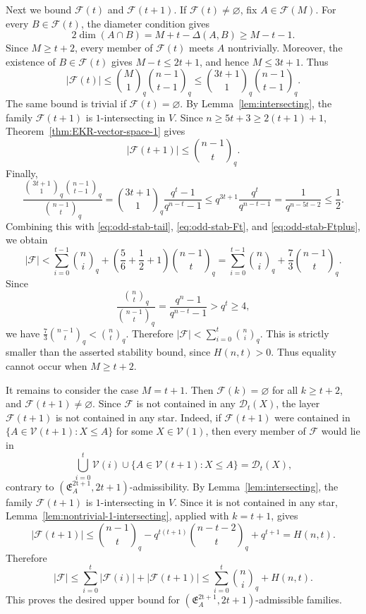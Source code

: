 \documentclass[11pt]{article}
\theoremstyle{definition}
\newcommand{\qbinom}[2]{\genfrac{(}{)}{0pt}{}{#1}{#2}_q}
\begin{document}
 
Next we bound $\mathcal F(t)$ and $\mathcal F(t+1)$.
If $\mathcal F(t)\neq\varnothing$, fix $A\in\mathcal F(M)$. 
For every $B\in\mathcal F(t)$, the diameter condition gives
\[
2\dim(A\cap B)=M+t-\Delta(A,B)\ge M-t-1.
\]
Since $M\ge t+2$, every member of $\mathcal F(t)$ meets $A$ nontrivially. 
Moreover, the existence of $B\in\mathcal F(t)$ gives $M-t\le 2t+1$, and hence $M\le 3t+1$. 
Thus
\begin{equation}\label{eq:odd-stab-Ft}
|\mathcal F(t)|
\le
\qbinom{M}{1}\qbinom{n-1}{t-1}
\le
\qbinom{3t+1}{1}\qbinom{n-1}{t-1}.
\end{equation}
The same bound is trivial if $\mathcal F(t)=\varnothing$. By Lemma~\ref{lem:intersecting}, the family $\mathcal F(t+1)$ is $1$-intersecting in $V$. 
Since $n\ge 5t+3\ge 2(t+1)+1$, Theorem~\ref{thm:EKR-vector-space-1} gives
\begin{equation}\label{eq:odd-stab-Ftplus}
|\mathcal F(t+1)|\le \qbinom{n-1}{t}.
\end{equation}
Finally,
\[
\frac{\qbinom{3t+1}{1}\qbinom{n-1}{t-1}}{\qbinom{n-1}{t}}
=
\qbinom{3t+1}{1}\frac{q^t-1}{q^{n-t}-1}
\le
q^{3t+1}\frac{q^t}{q^{n-t-1}}
=
\frac{1}{q^{n-5t-2}}
\le \frac12.
\]
Combining this with \eqref{eq:odd-stab-tail}, \eqref{eq:odd-stab-Ft}, and \eqref{eq:odd-stab-Ftplus}, we obtain
\[
|\mathcal F|
<
\sum_{i=0}^{t-1}\qbinom{n}{i}
+
\left(\frac56+\frac12+1\right)\qbinom{n-1}{t}
=
\sum_{i=0}^{t-1}\qbinom{n}{i}
+
\frac73\qbinom{n-1}{t}.
\]
Since
\[
\frac{\qbinom{n}{t}}{\qbinom{n-1}{t}}
=
\frac{q^n-1}{q^{n-t}-1}
>
q^t
\ge 4,
\]
we have $\frac73\qbinom{n-1}{t}<\qbinom{n}{t}$. Therefore
\(
|\mathcal F|<\sum_{i=0}^{t}\qbinom{n}{i}.
\)
This is strictly smaller than the asserted stability bound, since $H(n,t)>0$. 
Thus equality cannot occur when $M\ge t+2$.

It remains to consider the case $M=t+1$. 
Then $\mathcal F(k)=\varnothing$ for all $k\ge t+2$, and $\mathcal F(t+1)\neq\varnothing$. 
Since $\mathcal F$ is not contained in any $\mathcal D_t(X)$, the layer $\mathcal F(t+1)$ is not contained in any star. 
Indeed, if $\mathcal F(t+1)$ were contained in $\{A\in\mathcal V(t+1):X\le A\}$ for some $X\in\mathcal V(1)$, then every member of $\mathcal F$ would lie in
\[
\bigcup_{i=0}^{t}\mathcal V(i)
\cup
\{A\in\mathcal V(t+1):X\le A\}
=
\mathcal D_t(X),
\]
contrary to $(\mathfrak E_A^{\mathrm{2t+1}},2t+1)$-admissibility. By Lemma~\ref{lem:intersecting}, the family $\mathcal F(t+1)$ is $1$-intersecting in $V$. 
Since it is not contained in any star, Lemma~\ref{lem:nontrivial-1-intersecting}, applied with $k=t+1$, gives
\[
|\mathcal F(t+1)|
\le
\qbinom{n-1}{t}
-
q^{t(t+1)}\qbinom{n-t-2}{t}
+
q^{t+1}
=
H(n,t).
\]
Therefore
\[
|\mathcal F|
\le
\sum_{i=0}^{t}|\mathcal F(i)|+|\mathcal F(t+1)|
\le
\sum_{i=0}^{t}\qbinom{n}{i}+H(n,t).
\]
This proves the desired upper bound for $(\mathfrak E_A^{\mathrm{2t+1}},2t+1)$-admissible families.
\end{document}

